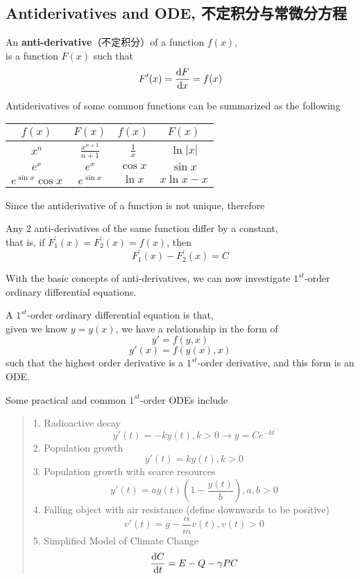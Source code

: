 \subsection{Antiderivatives and ODE, 不定积分与常微分方程}
\begin{definition}
    An \textbf{anti-derivative}（不定积分）of a function $f(x)$, \\
    is a function $F(x)$ such that
    $$F'(x) = \dv{F}{x} = f(x)$$
\end{definition}
Antiderivatives of some common functions can be summarized as the following
\begin{center}
    \begin{tabular}{||c|c|c|c||}
        \hline
        $f(x)$ & $F(x)$ & $f(x)$ & $F(x)$ \\
        \hline
        $x^n$ & $\frac{x^{n+1}}{n+1}$ & $\frac{1}{x}$ & $\ln{|x|}$ \\
        \hline
        $e^x$ & $e^x$ & $\cos{x}$ & $\sin{x}$ \\
        \hline
        $e^{\sin{x}}\cos{x}$ & $e^{\sin{x}}$ & $\ln{x}$ & $x \ln{x} - x$ \\
        \hline
    \end{tabular}
\end{center}
Since the antiderivative of a function is not unique, therefore
\begin{theorem}
    Any $2$ anti-derivatives of the same function differ by a constant, \\
    that is, if $F_1^{'}(x) = F_2^{'}(x) = f(x)$, then
    $$F_1^{'}(x) - F_2^{'}(x) = C$$
\end{theorem}
With the basic concepts of anti-derivatives, we can now investigate $1^{st}$-order ordinary differential equations.
\begin{definition}
    A $1^{st}$-order ordinary differential equation is that, \\
    given we know $y=y(x)$, we have a relationship in the form of
    $$y' = f(y, x)$$
    $$y'(x) = f(y(x), x)$$
    such that the highest order derivative is a $1^{st}$-order derivative, and this form is an ODE.
\end{definition}
Some practical and common $1^{st}$-order ODEs include
\begin{quote}
    1. Radioactive decay
    $$y'(t) = -ky(t), k > 0 \to y = Ce^{-kt}$$
    2. Population growth
    $$y'(t) = ky(t), k>0$$
    3. Population growth with scarce resources
    $$y'(t) = ay(t)(1-\frac{y(t)}{b}), a,b>0$$
    4. Falling object with air resistance (define downwards to be positive)
    $$v'(t) = g - \frac{\alpha}{m}v(t), v(t) > 0$$
    5. Simplified Model of Climate Change
    $$\dv{C}{t} = E - Q - \gamma PC$$
\end{quote}
